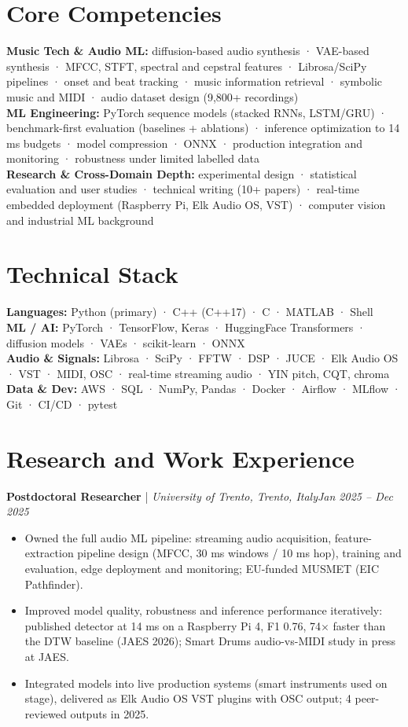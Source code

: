 \documentclass[11pt]{article}
\newenvironment{cvrole}[5]{%
  \par\noindent\textbf{\large #1} | \textit{\small #2, #3}\hfill \textit{\small #4 -- #5}\par
  \begin{itemize}[leftmargin=2em, itemsep=-0.3em, topsep=-0.5em]%
}{%
  \end{itemize}\par\noindent\mbox{}\par\vspace{0.1em}%
}
\begin{document}
\section*{Core Competencies}

\textbf{Music Tech \& Audio ML:} diffusion-based audio synthesis · VAE-based synthesis · MFCC, STFT, spectral and cepstral features · Librosa/SciPy pipelines · onset and beat tracking · music information retrieval · symbolic music and MIDI · audio dataset design (9,800+ recordings)\\
\textbf{ML Engineering:} PyTorch sequence models (stacked RNNs, LSTM/GRU) · benchmark-first evaluation (baselines + ablations) · inference optimization to 14 ms budgets · model compression · ONNX · production integration and monitoring · robustness under limited labelled data\\
\textbf{Research \& Cross-Domain Depth:} experimental design · statistical evaluation and user studies · technical writing (10+ papers) · real-time embedded deployment (Raspberry Pi, Elk Audio OS, VST) · computer vision and industrial ML background

\section*{Technical Stack}

\textbf{Languages:} Python (primary) · C++ (C++17) · C · MATLAB · Shell\\
\textbf{ML / AI:} PyTorch · TensorFlow, Keras · HuggingFace Transformers · diffusion models · VAEs · scikit-learn · ONNX\\
\textbf{Audio \& Signals:} Librosa · SciPy · FFTW · DSP · JUCE · Elk Audio OS · VST · MIDI, OSC · real-time streaming audio · YIN pitch, CQT, chroma\\
\textbf{Data \& Dev:} AWS · SQL · NumPy, Pandas · Docker · Airflow · MLflow · Git · CI/CD · pytest

\section*{Research and Work Experience}

\begin{cvrole}{Postdoctoral Researcher}{University of Trento}{Trento, Italy}{Jan 2025}{Dec 2025}
    \item Owned the full audio ML pipeline: streaming audio acquisition, feature-extraction pipeline design (MFCC, 30 ms windows / 10 ms hop), training and evaluation, edge deployment and monitoring; EU-funded MUSMET (EIC Pathfinder).
    \item Improved model quality, robustness and inference performance iteratively: published detector at 14 ms on a Raspberry Pi 4, F1 0.76, 74$\times$ faster than the DTW baseline (JAES 2026); Smart Drums audio-vs-MIDI study in press at JAES.
    \item Integrated models into live production systems (smart instruments used on stage), delivered as Elk Audio OS VST plugins with OSC output; 4 peer-reviewed outputs in 2025.
\end{cvrole}
\end{document}
